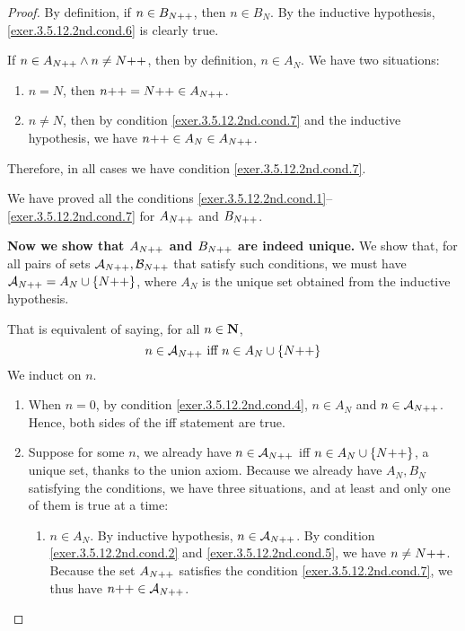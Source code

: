 \begin{proof}
	By definition, if $n \in B_{N{+}{+}}$, then $n \in B_N$. By the inductive hypothesis, \ref{exer.3.5.12.2nd.cond.6} is clearly true.
	
	If $n \in A_{N{+}{+}} \wedge n \ne N{+}{+}$, then by definition, $n \in A_N$. We have two situations:
	\begin{enumerate}
		\item $n = N$, then $n{+}{+} = N{+}{+} \in A_{N{+}{+}}$.
		\item $n \ne N$, then by condition \ref{exer.3.5.12.2nd.cond.7} and the inductive hypothesis, we have $n{+}{+} \in A_N \in A_{N{+}{+}}$.
	\end{enumerate}
	Therefore, in all cases we have condition \ref{exer.3.5.12.2nd.cond.7}.
	
	We have proved all the conditions \ref{exer.3.5.12.2nd.cond.1}--\ref{exer.3.5.12.2nd.cond.7} for $A_{N{+}{+}}$ and $B_{N{+}{+}}$. 
	
	\textbf{Now we show that $A_{N{+}{+}}$ and $B_{N{+}{+}}$ are indeed unique.}%
	\begingroup
	\def\anpp{{\cal A}_{\successor{N}}}%
	\def\bnpp{{\cal B}_{\successor{N}}}%
	We show that, for all pairs of sets $\anpp,\bnpp$ that satisfy such conditions, we must have $\anpp = A_N \cup \{\successor{N}\}$, where $A_N$ is the unique set obtained from the inductive hypothesis.
	
	That is equivalent of saying, for all $n \in \mathbf{N}$,
	\[
		n \in \anpp \hbox{ iff } n \in A_N \cup \{\successor{N}\}
	\]
	We induct on $n$.
	\begin{enumerate}
		\item \mybcbox When $n = 0$, by condition \ref{exer.3.5.12.2nd.cond.4}, $n \in A_N$ and $n \in \anpp$. Hence, both sides of the iff statement are true.
		
		\item \myisbox Suppose for some $n$, we already have $n \in \anpp$ iff $n \in A_N \cup \{N{+}{+}\}$, a unique set, thanks to the union axiom. Because we already have $A_N,B_N$ satisfying the conditions, we have three situations, and at least and only one of them is true at a time:
		\begin{enumerate}
			\item $n \in A_N$. By inductive hypothesis, $n \in \anpp$. By condition \ref{exer.3.5.12.2nd.cond.2} and \ref{exer.3.5.12.2nd.cond.5}, we have $n \ne N{+}{+}$. Because the set $A_{N{+}{+}}$ satisfies the condition \ref{exer.3.5.12.2nd.cond.7}, we thus have $\successor{n} \in \anpp$. 
			

\end{enumerate}
\end{enumerate}
\end{proof}
